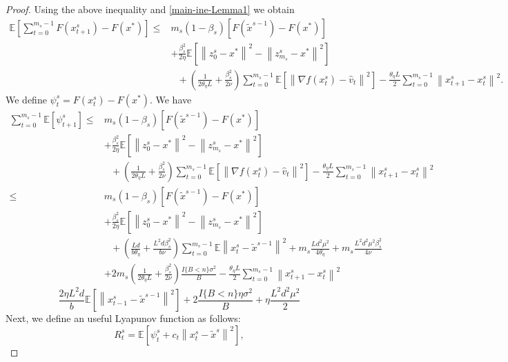 \documentclass{article}
\newcommand*{\E}{\mathbb{E}}
\newcommand{\norm}[1]{\left\lVert#1\right\rVert}
\theoremstyle{definition}
\theoremstyle{remark}
\begin{document}
{\begin{proof}
Using the above inequality and \eqref{main-ine-Lemma1} we obtain
\begin{equation}
\begin{split}
\E[\sum_{t=0}^{m_s-1}F(x_{t+1}^s)-F(x^*)] \leq & m_s(1-\beta_s)[F(\widetilde{x}^{s-1})-F(x^*)] \\
&+ {\frac{ \beta_s^2}{2\eta}}\E[\norm{z_{0}^s-x^*}^2-\norm{z_{m_s}^s-x^*}^2]\\
&~~~+(\frac{1}{2\theta_{\eta} L}+\frac{\beta_s^2}{2\nu})\sum_{t=0}^{m_s-1}\E\left[\norm{\nabla f(x_{t}^s)-\hat{v}_{t}}^2\right]-\frac{\theta_{\eta} L}{2}\sum_{t=0}^{m_s-1}\norm{x_{t+1}^s-x_{t}^s}^2. 
\end{split}
\end{equation}
We define $\psi_t^s = F({x}^s_t)-F(x^*)$. We have
\begin{equation}
\begin{split}
\sum_{t=0}^{m_s-1}\E[\psi_{t+1}^s] \leq &m_s(1-\beta_s)[F(\widetilde{x}^{s-1})-F(x^*)] \\
&+ {\frac{ \beta_s^2}{2\eta}}\E[\norm{z_{0}^s-x^*}^2-\norm{z_{m_s}^s-x^*}^2]\\
&~~~+(\frac{1}{2\theta_{\eta} L}+\frac{\beta_s^2}{2\nu})\sum_{t=0}^{m_s-1}\E\left[\norm{\nabla f(x_{t}^s)-\hat{v}_{t}}^2\right]-\frac{\theta_{\eta} L}{2}\sum_{t=0}^{m_s-1}\norm{x_{t+1}^s-x_{t}^s}^2\\
\leq &m_s(1-\beta_s)[F(\widetilde{x}^{s-1})-F(x^*)] \\
&+ {\frac{ \beta_s^2}{2\eta}}\E[\norm{z_{0}^s-x^*}^2-\norm{z_{m_s}^s-x^*}^2]\\
&~~~+(\frac{Ld}{b\theta_{\eta}}+\frac{L^2d\beta_s^2}{b\nu})\sum_{t=0}^{m_s-1} \E\norm{x_t^s-\widetilde{x}^{s-1}}^2+m_s\frac{Ld^2\mu^2}{4\theta_{\eta}}+m_s\frac{ L^2d^2\mu^2\beta_s^2}{4\nu}\\
&+ 2m_s(\frac{1}{2\theta_{\eta} L}+\frac{\beta_s^2}{2\nu})\frac{I\{B < n\} \sigma ^2}{B}-\frac{\theta_{\eta} L}{2}\sum_{t=0}^{m_s-1}\norm{x_{t+1}^s-x_{t}^s}^2
\end{split}
\end{equation}
{\color{red}
\begin{equation}
\frac{2\eta L^2 d}{b}\E\left[\norm{x_{t-1}^s-\widetilde{x}^{s-1}}^2\right]+ 2\frac{I\{B < n\}\eta \sigma ^2}{B}+\eta \frac{L^2 d^2 \mu^2}{2}
\end{equation}}
Next, we define an useful Lyapunov function as follows:
\begin{equation}
R_t^s = \E\left[\psi_{t}^s+ c_t\norm{x_t^s-\tilde{x}^s}^2\right],
\end{equation}

\end{proof}}
\end{document}
